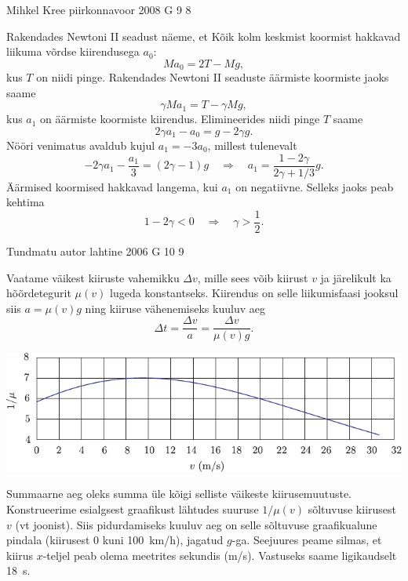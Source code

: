 \documentclass[11pt]{article}
\begin{document}
{%
{Mihkel Kree} %
{piirkonnavoor} %
{2008} %
{G 9} %
{8} %
{

\ifSolution
Rakendades Newtoni II seadust näeme, et Kõik kolm keskmist koormist hakkavad liikuma võrdse kiirendusega $a_0$: 
\[
M a_0 = 2T - Mg,
\]
kus $T$ on niidi pinge. Rakendades Newtoni II seaduste äärmiste koormiste jaoks saame
\[
\gamma M a_1 = T - \gamma Mg,
\]
kus $a_1$ on äärmiste koormiste kiirendus. Elimineerides niidi pinge $T$ saame
\[
2\gamma a_1 - a_0 = g - 2\gamma g.
\] 
Nööri venimatus avaldub kujul $a_1 = -3a_0$, millest tulenevalt 
\[
-2 \gamma a_{1}-\frac{a_{1}}{3}=(2 \gamma-1) g \quad \Rightarrow \quad a_{1}=\frac{1-2 \gamma}{2 \gamma+1 / 3} g.
\]
Äärmised koormised hakkavad langema, kui $a_1$ on negatiivne. Selleks jaoks peab kehtima
\[
1-2 \gamma<0 \quad\Rightarrow\quad \gamma>\frac{1}{2}.
\]
\fi
}

{Tundmatu autor} %
{lahtine} %
{2006} %
{G 10} %
{9} %
{

\ifSolution
\osa Vaatame väikest kiiruste vahemikku $\Delta v$, mille sees võib kiirust $v$ ja järelikult ka hõõrdetegurit $\mu (v)$ lugeda konstantseks. Kiirendus on selle liikumisfaasi jooksul siis $a = \mu (v)g$ ning kiiruse vähenemiseks kuuluv aeg
\[
\Delta t=\frac{\Delta v}{a}=\frac{\Delta v}{\mu(v) g}.
\]

\begin{center}
	\includegraphics[width=\linewidth]{2006-lahg-10-lah1}
\end{center}

Summaarne aeg oleks summa üle kõigi selliste väikeste kiirusemuutuste. Konstrueerime esialgsest graafikust lähtudes suuruse $1/\mu (v)$ sõltuvuse kiirusest $v$ (vt joonist). Siis pidurdamiseks kuuluv aeg on selle sõltuvuse graafikualune pindala (kiirusest \num{0} kuni \SI{100}{km/h}), jagatud $g$-ga. Seejuures peame silmas, et kiirus $x$-teljel peab olema meetrites sekundis (\si{m/s}). Vastuseks saame ligikaudselt \SI{18}{s}.

}}
\end{document}
